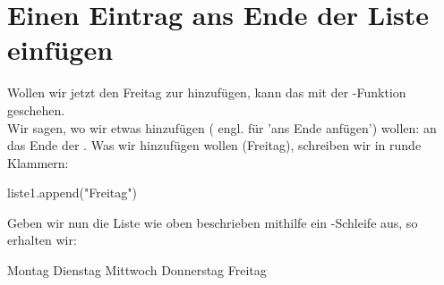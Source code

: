 \documentclass{\VorlagenPfad/coderdojokatext}
\begin{document}
\section{Einen Eintrag ans Ende der Liste einfügen}
Wollen wir jetzt den Freitag zur  hinzufügen, kann das mit der -Funktion geschehen.
\\
Wir sagen, wo wir etwas hinzufügen ( engl. für 'ans Ende anfügen') wollen: an das Ende der .
Was wir hinzufügen wollen (Freitag), schreiben wir in runde Klammern:
\begin{pythoncode}
liste1.append("Freitag") 
\end{pythoncode}
Geben wir nun die Liste wie oben beschrieben mithilfe ein -Schleife aus, so erhalten wir:
\begin{pseudocode}
Montag
Dienstag
Mittwoch
Donnerstag	
Freitag
\end{pseudocode}
\end{document}
